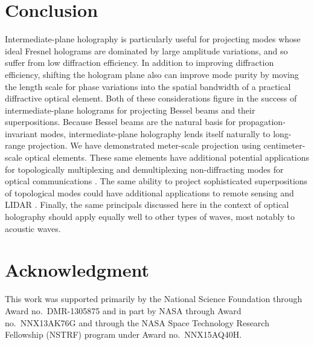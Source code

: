 \section{Conclusion}

Intermediate-plane holography is particularly useful for projecting
modes whose ideal Fresnel holograms are dominated by large
amplitude variations, and so suffer from low diffraction efficiency.
In addition to improving diffraction efficiency, shifting the
hologram plane also can improve mode purity by moving the
length scale for phase variations into the spatial bandwidth of a
practical diffractive optical element.
Both of these considerations figure in the success of intermediate-plane
holograms for projecting Bessel beams and their superpositions.
Because Bessel beams are the natural basis for propagation-invariant
modes, intermediate-plane holography lends itself naturally
to long-range projection.
We have demonstrated meter-scale projection using centimeter-scale
optical elements.
These same elements have additional potential applications for
topologically multiplexing and demultiplexing non-diffracting modes
for optical communications \cite{gibson04,bozinovic13,willner15}.
The same ability to project sophisticated superpositions of
topological modes could have additional applications to remote
sensing and LIDAR \cite{cvijetic15}.
Finally, the same principals discussed here in the context of
optical holography should apply equally well to other types
of waves, most notably to acoustic waves.


\section{Acknowledgment}
This work was supported primarily by the National Science Foundation
through Award no.\ DMR-1305875 and in part by NASA through
Award no.\ NNX13AK76G and through the NASA Space Technology Research
Fellowship (NSTRF) program under Award no.\ NNX15AQ40H.




